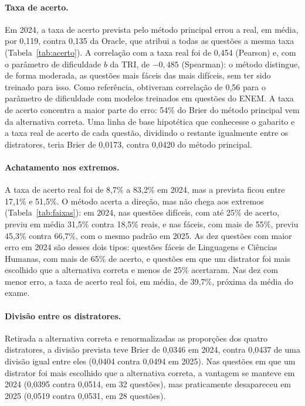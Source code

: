 \paragraph{Taxa de acerto.} Em 2024, a taxa de acerto prevista pelo método principal errou a real, em média, por 0,119, contra 0,135 da Oracle, que atribui a todas as questões a mesma taxa (Tabela~\ref{tab:acerto}). A correlação com a taxa real foi de 0,454 (Pearson) e, com o parâmetro de dificuldade $b$ da TRI, de $-0{,}485$ (Spearman): o método distingue, de forma moderada, as questões mais fáceis das mais difíceis, sem ter sido treinado para isso. Como referência, \citet{marinho2023} obtiveram correlação de 0,56 para o parâmetro de dificuldade com modelos treinados em questões do ENEM. A taxa de acerto concentra a maior parte do erro: 54\% do Brier do método principal vem da alternativa correta. Uma linha de base hipotética que conhecesse o gabarito e a taxa real de acerto de cada questão, dividindo o restante igualmente entre os distratores, teria Brier de 0,0173, contra 0,0420 do método principal.



\paragraph{Achatamento nos extremos.} A taxa de acerto real foi de 8,7\% a 83,2\% em 2024, mas a prevista ficou entre 17,1\% e 51,5\%. O método acerta a direção, mas não chega aos extremos (Tabela~\ref{tab:faixas}): em 2024, nas questões difíceis, com até 25\% de acerto, previu em média 31,5\% contra 18,5\% reais, e nas fáceis, com mais de 55\%, previu 45,3\% contra 66,7\%, com o mesmo padrão em 2025. As dez questões com maior erro em 2024 são desses dois tipos: questões fáceis de Linguagens e Ciências Humanas, com mais de 65\% de acerto, e questões em que um distrator foi mais escolhido que a alternativa correta e menos de 25\% acertaram. Nas dez com menor erro, a taxa de acerto real foi, em média, de 39,7\%, próxima da média do exame.



\paragraph{Divisão entre os distratores.} Retirada a alternativa correta e renormalizadas as proporções dos quatro distratores, a divisão prevista teve Brier de 0,0346 em 2024, contra 0,0437 de uma divisão igual entre eles (0,0404 contra 0,0494 em 2025). Nas questões em que um distrator foi mais escolhido que a alternativa correta, a vantagem se manteve em 2024 (0,0395 contra 0,0514, em 32 questões), mas praticamente desapareceu em 2025 (0,0519 contra 0,0531, em 28 questões).

